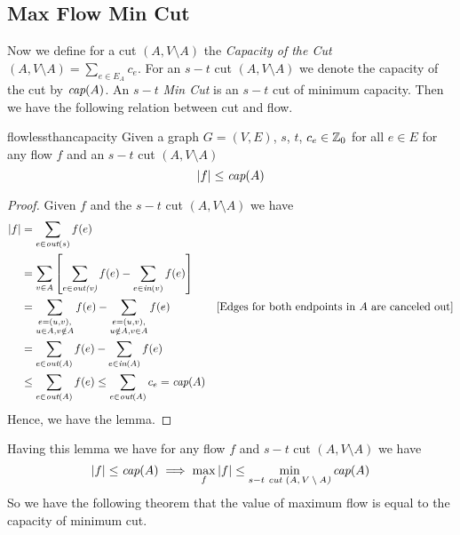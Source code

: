 \subsection{Max Flow Min Cut}
Now we define for a cut $(A,V\setminus A)$ the \emph{Capacity of the Cut} $(A,V\setminus A)=\sum\limits_{e\in E_A}c_e$. For an $s-t$ cut $(A,V\setminus A)$ we denote the capacity of the cut by $\emph{cap}(A)$. An $s-t$ \emph{Min  Cut} is an $s-t$ cut of minimum capacity. Then we have the following relation between cut and flow.
\begin{lemma}{}{flowlessthancapacity}
	Given a graph $G=(V,E)$, $s$, $t$, $c_e\in\mathbb{Z}_0$ for all $e\in E$ for any flow $f$ and an $s-t$ cut $(A,V\setminus A)$ $$|f|\leq \emph{cap}(A)$$
\end{lemma}
\begin{proof}
	Given $f$ and the $s-t$ cut $(A,V\setminus A)$ we have \begin{align*}
		|f| & = \sum_{e\in\emph{out$(s)$}}f(e)                                                          \\
		    & = \sum_{v\in A}\left[ \sum_{e\in\emph{out(v)}}f(e)-\sum_{e\in \emph{in$(v)$}}f(e)  \right]   \\
		    & = \sum_{\substack{e=(u,v),                                                                  \\ u\in A,v\notin A}}f(e) -\sum_{\substack{e=(u,v),\\ u\notin A,v\in A}}f(e) & [\text{Edges for both endpoints in $A$ are canceled out}]\\
		    & =\sum_{e\in \emph{out$(A)$}}f(e)-\sum_{e\in \emph{in}(A)}f(e)                           \\
		    & \leq \sum_{e\in \emph{out$(A)$}}f(e)\leq \sum_{e\in \emph{out$(A)$}}c_e=\emph{cap}(A)
	\end{align*}
	Hence, we have the lemma.
\end{proof}
Having this lemma we have for any flow $f$ and $s-t$ cut $(A,V\setminus A)$ we have $$|f|\leq \emph{cap$(A)$}\implies \max\limits_f|f|\leq\min\limits_{s-t\emph{ cut $(A,V\setminus A$)}}\emph{cap$(A)$}$$So we have the following theorem that the value of maximum flow is equal to the capacity of minimum cut.
